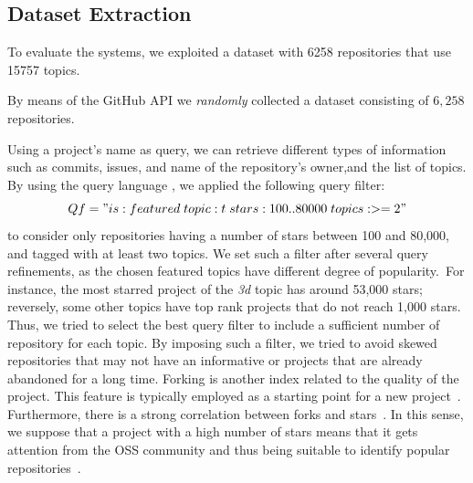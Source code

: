 \subsection{Dataset Extraction} \label{sec:Dataset}



To evaluate the systems, we exploited a dataset with 6258 \GH repositories that use 15757 topics.

By means of the GitHub API \cite{githubAPI} we \emph{randomly} collected a dataset consisting of $6,258$ repositories. 

Using a project's name as query, we can retrieve different types of information such as commits, issues, and name 
of  the repository's owner,and the list of topics. By using the \GH query language 
\cite{noauthor_understanding_nodate}, we applied the following query filter:
\begin{equation}
\small
Qf = "is:featured \; topic:t \; stars:100..80000 \; topics:>=2"
\end{equation}%
to consider only \GH repositories having a number of stars between 100 and 
80,000, and tagged with at least two topics. We set such a filter after several 
query refinements, as the chosen featured topics have different degree of 
popularity.~For instance, the most starred project of the \emph{3d} topic has 
around 53,000 stars; reversely, some other topics have top rank projects that 
do not reach 1,000 stars. Thus, we tried to select the best query filter to 
include a sufficient number of repository for each topic. %
By imposing such a filter, we tried to avoid skewed repositories that may not have an informative \RM or projects that are already abandoned for a long time.
Forking is another index related to the quality of the project. This feature is 
typically employed as a starting point for a new 
project~\cite{Jiang:2017:WDF:3042021.3042043}. Furthermore, there is a strong 
correlation between forks and stars~\cite{7816479}. In this sense, we suppose 
that a project with a high number of stars means that it gets attention from 
the OSS community and thus being suitable to identify popular 
repositories~\cite{borges_popularity_2017, borges_predicting_2016}. 




